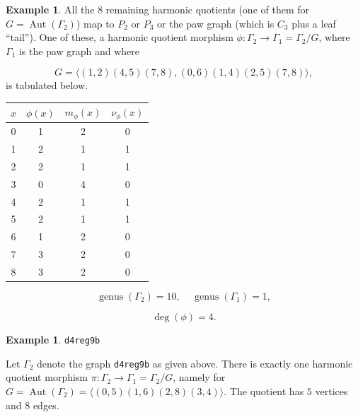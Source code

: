 \documentclass[12pt,letterpaper]{article}
\theoremstyle{definition}
\newtheorem{example}[theorem]{Example}
\DeclareMathOperator{\Aut}{Aut}
\DeclareMathOperator{\genus}{genus}
\begin{document}
\begin{example}
{All the $8$ remaining harmonic quotients (one of them for $G=\Aut(\Gamma_2)$) map to $P_2$ or $P_3$ or the
paw graph (which is $C_3$ plus a leaf ``tail'').
One of these, a harmonic quotient morphism
$\phi: \Gamma_2\to \Gamma_1=\Gamma_2/G$,
where $\Gamma_1$ is the paw graph and where

\[
G = \langle (1,2)(4,5)(7,8), (0,6)(1,4)(2,5)(7,8) \rangle,
\]
is tabulated below.

\begin{center}
\begin{tabular}{c|c|c|c}  
  $x$ & $\phi(x)$ & $m_\phi(x)$ & $\nu_\phi(x)$ \\ \hline
  0   &    1   &        2         &  0   \\
  1   &    2   &        1         &  1   \\
  2   &    2   &        1         &  1   \\
  3   &    0   &        4         &  0   \\
  4   &    2   &        1         &  1   \\
  5   &    2   &        1         &  1   \\
  6   &    1   &        2         &  0   \\
  7   &    3   &        2         &  0   \\
  8   &    3   &        2         &  0   \\
\end{tabular}
\end{center}

\[
  \genus(\Gamma_2) =10,\ \ \ \ \
  \genus(\Gamma_1) =1,
\]

\[
\deg(\phi) =4.
\]


}
\end{example}


\begin{example}%
\label{example:d4reg9b}
 {\tt d4reg9b}\newline
{\rm  
  Let $\Gamma_2$ denote the graph {\tt d4reg9b} as given above.
There is exactly one harmonic quotient morphism
$\pi: \Gamma_2\to \Gamma_1=\Gamma_2/G$, namely for
$G=\Aut(\Gamma_2)=\langle (0,5)(1,6)(2,8)(3,4)\rangle$. The quotient
has $5$ vertices and $8$ edges.

}
\end{example}
\end{document}
